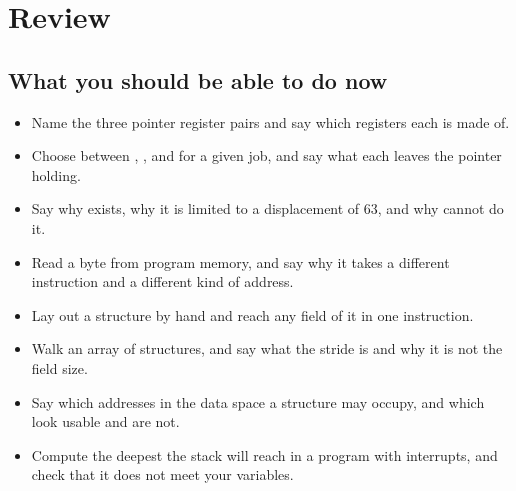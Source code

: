 
\section{Review}
\label{c4:sec:review}

\subsection*{What you should be able to do now}
\begin{itemize}
  \item Name the three pointer register pairs and say which registers each is made of.
  \item Choose between , ,  and  for a given job,
    and say what each leaves the pointer holding.
  \item Say why  exists, why it is limited to a displacement of 63, and why 
    cannot do it.
  \item Read a byte from program memory, and say why it takes a different instruction and a
    different kind of address.
  \item Lay out a structure by hand and reach any field of it in one instruction.
  \item Walk an array of structures, and say what the stride is and why it is not the field size.
  \item Say which addresses in the data space a structure may occupy, and which look usable and are
    not.
  \item Compute the deepest the stack will reach in a program with interrupts, and check that it
    does not meet your variables.
\end{itemize}

